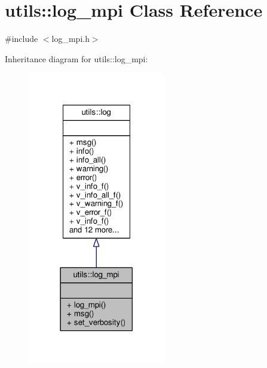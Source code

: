 \hypertarget{classutils_1_1log__mpi}{\section{utils\-:\-:log\-\_\-mpi Class Reference}
\label{classutils_1_1log__mpi}
}


{\ttfamily \#include $<$log\-\_\-mpi.\-h$>$}



Inheritance diagram for utils\-:\-:log\-\_\-mpi\-:
\nopagebreak
\begin{figure}[H]
\begin{center}
\leavevmode
\includegraphics[width=170pt]{classutils_1_1log__mpi__inherit__graph}
\end{center}
\end{figure}


